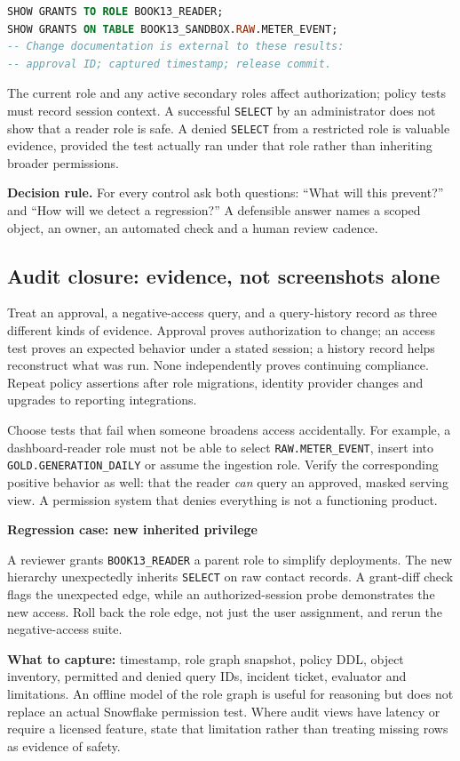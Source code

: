 \documentclass[11pt,twoside]{article}
\begin{document}
\begin{lstlisting}[language=SQL,caption={Read-only inspection; use a dedicated approved review role.}]
SHOW GRANTS TO ROLE BOOK13_READER;
SHOW GRANTS ON TABLE BOOK13_SANDBOX.RAW.METER_EVENT;
-- Change documentation is external to these results:
-- approval ID; captured timestamp; release commit.
\end{lstlisting}
The current role and any active secondary roles affect authorization; policy tests must record session context. A successful \texttt{SELECT} by an administrator does not show that a reader role is safe. A denied \texttt{SELECT} from a restricted role is valuable evidence, provided the test actually ran under that role rather than inheriting broader permissions.
\begin{insight}\textbf{Decision rule.} For every control ask both questions: ``What will this prevent?'' and ``How will we detect a regression?'' A defensible answer names a scoped object, an owner, an automated check and a human review cadence.\end{insight}
\newpage
\subsection*{Audit closure: evidence, not screenshots alone}
Treat an approval, a negative-access query, and a query-history record as three different kinds of evidence. Approval proves authorization to change; an access test proves an expected behavior under a stated session; a history record helps reconstruct what was run. None independently proves continuing compliance. Repeat policy assertions after role migrations, identity provider changes and upgrades to reporting integrations.

Choose tests that fail when someone broadens access accidentally. For example, a dashboard-reader role must not be able to select \texttt{RAW.METER\_EVENT}, insert into \texttt{GOLD.GENERATION\_DAILY} or assume the ingestion role. Verify the corresponding positive behavior as well: that the reader \emph{can} query an approved, masked serving view. A permission system that denies everything is not a functioning product.
\begin{whitebox}\textbf{Regression case: new inherited privilege}\par
A reviewer grants \texttt{BOOK13\_READER} a parent role to simplify deployments. The new hierarchy unexpectedly inherits \texttt{SELECT} on raw contact records. A grant-diff check flags the unexpected edge, while an authorized-session probe demonstrates the new access. Roll back the role edge, not just the user assignment, and rerun the negative-access suite.
\end{whitebox}
\textbf{What to capture:} timestamp, role graph snapshot, policy DDL, object inventory, permitted and denied query IDs, incident ticket, evaluator and limitations. An offline model of the role graph is useful for reasoning but does not replace an actual Snowflake permission test. Where audit views have latency or require a licensed feature, state that limitation rather than treating missing rows as evidence of safety.
\end{document}
